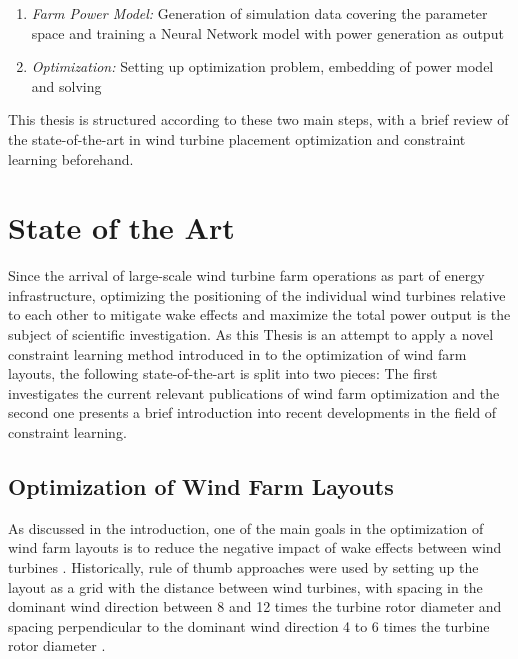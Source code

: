 \documentclass[preprint,12pt]{elsarticle}
\begin{document}
\begin{enumerate}
	\item \textit{Farm Power Model:} Generation of simulation data covering the parameter space and training a Neural Network model with power generation as output
	\item \textit{Optimization:} Setting up optimization problem, embedding of power model and solving
\end{enumerate}

This thesis is structured according to these two main steps, with a brief review of the state-of-the-art in wind turbine placement optimization and constraint learning beforehand. 


\section{State of the Art}\label{chapter:state_of_the_art}

Since the arrival of large-scale wind turbine farm operations as part of energy infrastructure, optimizing the positioning of the individual wind turbines relative to each other to mitigate wake effects and maximize the total power output is the subject of scientific investigation. As this Thesis is an attempt to apply a novel constraint learning method introduced in \cite{ALCANTARA2023120895} to the optimization of wind farm layouts, the following state-of-the-art is split into two pieces:  The first investigates the current relevant publications of wind farm optimization and the second one presents a brief introduction into recent developments in the field of constraint learning. 

\subsection{Optimization of Wind Farm Layouts}

As discussed in the introduction, one of the main goals in the optimization of wind farm layouts is to reduce the negative impact of wake effects between wind turbines \cite{KIM2024123383}. Historically, rule of thumb approaches were used by setting up the layout as a grid  with the distance between wind turbines, with spacing in the dominant wind direction between 8 and 12 times the turbine rotor diameter and spacing perpendicular to the dominant wind direction 4 to 6 times the turbine rotor diameter \cite{AZLAN2021110047} \cite{hou_review_2019}.
\end{document}
